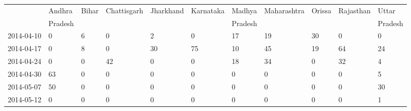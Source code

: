 \begin{tabular}{p{1cm}p{1cm}p{1cm}p{1cm}p{1cm}p{1cm}p{1cm}p{1cm}p{1cm}p{1cm}p{1cm}}
  \hline
 & Andhra  & Bihar & Chattisgarh & Jharkhand & Karnataka & Madhya  & Maharashtra & Orissa & Rajasthan & Uttar  \\ 
 &  Pradesh &  &  &  &  &  Pradesh &  &  &  &  Pradesh \\ 
  \hline
2014-04-10 &   0 &   6 &   0 &   2 &   0 &  17 &  19 &  30 &   0 &   0 \\ 
  2014-04-17 &   0 &   8 &   0 &  30 &  75 &  10 &  45 &  19 &  64 &  24 \\ 
  2014-04-24 &   0 &   0 &  42 &   0 &   0 &  18 &  34 &   0 &  32 &   4 \\ 
  2014-04-30 &  63 &   0 &   0 &   0 &   0 &   0 &   0 &   0 &   0 &   5 \\ 
  2014-05-07 &  50 &   0 &   0 &   0 &   0 &   0 &   0 &   0 &   0 &  30 \\ 
  2014-05-12 &   0 &   0 &   0 &   0 &   0 &   0 &   0 &   0 &   0 &   1 \\ 
   \hline
\end{tabular}

